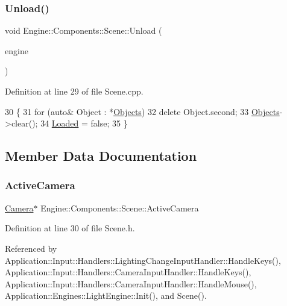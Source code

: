 \subsubsection{\texorpdfstring{Unload()}{Unload()}}
{\footnotesize\ttfamily void Engine\+::\+Components\+::\+Scene\+::\+Unload (\begin{DoxyParamCaption}\item[{\mbox{\hyperlink{classEngine_1_1BaseEngine}{Base\+Engine}} $\ast$}]{engine }\end{DoxyParamCaption})\hspace{0.3cm}{\ttfamily [virtual]}}



Definition at line 29 of file Scene.\+cpp.


\begin{DoxyCode}
30 \{
31     \textcolor{keywordflow}{for} (\textcolor{keyword}{auto}& Object : *\mbox{\hyperlink{classEngine_1_1Components_1_1Scene_a23481feabaaa56bf5613765db03af4da}{Objects}})
32         \textcolor{keyword}{delete} Object.second;
33     \mbox{\hyperlink{classEngine_1_1Components_1_1Scene_a23481feabaaa56bf5613765db03af4da}{Objects}}->clear();
34     \mbox{\hyperlink{classEngine_1_1Components_1_1Scene_ae828757eea5410550f6674421051a783}{Loaded}} = \textcolor{keyword}{false};
35 \}
\end{DoxyCode}


\subsection{Member Data Documentation}
\mbox{\label{classEngine_1_1Components_1_1Scene_a9408befee37d89e2c001d25b9e4ed75a}} 
\subsubsection{\texorpdfstring{Active\+Camera}{ActiveCamera}}
{\footnotesize\ttfamily \mbox{\hyperlink{classEngine_1_1Components_1_1Camera}{Camera}}$\ast$ Engine\+::\+Components\+::\+Scene\+::\+Active\+Camera}



Definition at line 30 of file Scene.\+h.



Referenced by Application\+::\+Input\+::\+Handlers\+::\+Lighting\+Change\+Input\+Handler\+::\+Handle\+Keys(), Application\+::\+Input\+::\+Handlers\+::\+Camera\+Input\+Handler\+::\+Handle\+Keys(), Application\+::\+Input\+::\+Handlers\+::\+Camera\+Input\+Handler\+::\+Handle\+Mouse(), Application\+::\+Engines\+::\+Light\+Engine\+::\+Init(), and Scene().


